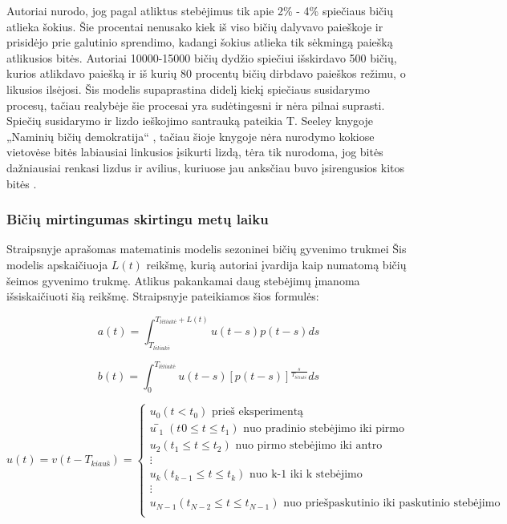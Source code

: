 \documentclass{VUMIFPSmagistrinis}
\begin{document}
Autoriai nurodo, jog pagal atliktus stebėjimus \cite{SeB99} tik apie 2\% - 4\% spiečiaus bičių atlieka šokius. Šie procentai nenusako kiek iš viso bičių dalyvavo paieškoje ir prisidėjo prie galutinio sprendimo, kadangi šokius atlieka tik sėkmingą paiešką atlikusios bitės. Autoriai 10000-15000 bičių dydžio spiečiui išskirdavo 500 bičių, kurios atlikdavo paiešką ir iš kurių 80 procentų bičių dirbdavo paieškos režimu, o likusios ilsėjosi.
Šis modelis supaprastina didelį kiekį spiečiaus susidarymo procesų, tačiau realybėje šie procesai yra sudėtingesni ir nėra pilnai suprasti. Spiečių susidarymo ir lizdo ieškojimo santrauką pateikia T. Seeley knygoje „Naminių bičių demokratija“ \cite{See10}, tačiau šioje knygoje nėra nurodymo kokiose vietovėse bitės labiausiai linkusios įsikurti lizdą, tėra tik nurodoma, jog bitės dažniausiai renkasi lizdus ir avilius, kuriuose jau anksčiau buvo įsirengusios kitos bitės \cite{VMS85}. 




\subsubsection{Bičių mirtingumas skirtingu metų laiku}

 Straipsnyje aprašomas matematinis modelis sezoninei bičių gyvenimo trukmei \cite{YYY19}
Šis modelis apskaičiuoja $L(t)$ reikšmę, kurią autoriai įvardija kaip numatomą bičių šeimos gyvenimo trukmę. Atlikus pakankamai daug stebėjimų įmanoma išsiskaičiuoti šią reikšmę. Straipsnyje pateikiamos šios formulės:

\begin{equation}
\label{emir1}
a(t)=\int_{T_{l\textit{\.e}liuk\textit{\.e}}}^{T_{l\textit{\.e}liuk\textit{\.e}}+L(t)}u(t-s)p(t-s)ds
\end{equation}

\begin{equation}
\label{emir2}
b(t)=\int_{0}^{T_{l\textit{\.e}liuk\textit{\.e}}}u(t-s)[p(t-s)]^{\frac{s}{T_{l\textit{\.e}liuk\textit{\.e}}}}ds
\end{equation}


\begin{equation}
\label{emir3}
u(t)=v(t-T_{kiau\textit{\v{s}}} )=
\begin{cases}
u_{0} (t<t_0 )  \text { prieš eksperimentą   }                                          \\
u ̅_{1} (t_{}0≤t≤t_{1} )  \text { nuo pradinio stebėjimo iki pirmo }                           \\
u_{2} (t_{1}≤t≤t_{2} )  \text { nuo pirmo stebėjimo iki antro }                               \\
\vdots \\
u_{k} (t_{k-1}≤t≤t_{k} )  \text { nuo k-1 iki k stebėjimo }                               \\
\vdots \\
u_{N-1} (t_{N-2}≤t≤t_{N-1} )  \text { nuo priešpaskutinio iki paskutinio stebėjimo } \\
\end{cases}
\end{equation}
\end{document}
